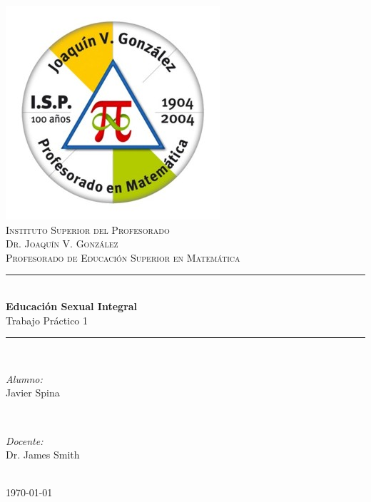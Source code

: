 \documentclass[a4paper,12pt]{article}
\begin{document}
    \newcommand{\HRule}{\rule{\linewidth}{0.5mm}}
    
    
    \begin{titlepage}
        \center

        \includegraphics[scale=0.4]{../resources/pinmatematica.jpg}\\[1cm]
        \textsc{\Large Instituto Superior del Profesorado}\\[0.3cm]
        \textsc{\LARGE Dr. Joaquín V. González}\\[1cm]
        \textsc{\large Profesorado de Educación Superior en Matemática}\\[0.5cm]
        
        \HRule \\[0.4cm]
            {\huge \bfseries Educación Sexual Integral}\\[0.3cm]
            \Large Trabajo Práctico 1\\
        \HRule \\[1.5cm]
        
        \begin{minipage}{0.4\textwidth}
            \begin{flushleft} 
                \large
                \emph{Alumno:}\\
                Javier Spina
            \end{flushleft}
        \end{minipage}
        ~
        \begin{minipage}{0.4\textwidth}
            \begin{flushright} 
                \large
                \emph{Docente:}\\
                Dr. James Smith
            \end{flushright}
        \end{minipage}\\[3cm]
        
        \vfill
        {\large \today}
        
        \restoregeometry
    \end{titlepage}
\end{document}
